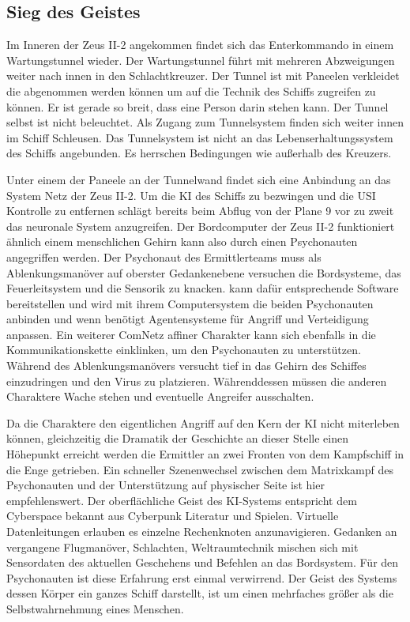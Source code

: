 \subsection{Sieg des Geistes}
Im Inneren der Zeus II-2 angekommen findet sich das Enterkommando in einem Wartungstunnel wieder. Der Wartungstunnel führt mit mehreren Abzweigungen weiter nach innen in den Schlachtkreuzer. Der Tunnel ist mit Paneelen verkleidet die abgenommen werden können um auf die Technik des Schiffs zugreifen zu können. Er ist gerade so breit, dass eine Person darin stehen kann. Der Tunnel selbst ist nicht beleuchtet. Als Zugang zum Tunnelsystem finden sich weiter innen im Schiff Schleusen. Das Tunnelsystem ist nicht an das Lebenserhaltungssystem des Schiffs angebunden. Es herrschen Bedingungen wie außerhalb des Kreuzers.

Unter einem der Paneele an der Tunnelwand findet sich eine Anbindung an das System Netz der Zeus II-2. Um die KI des Schiffs zu bezwingen und die USI Kontrolle zu entfernen schlägt \xl{} bereits beim Abflug von der Plane 9 vor zu zweit das neuronale System anzugreifen. Der Bordcomputer der Zeus II-2 funktioniert ähnlich einem menschlichen Gehirn kann also durch einen Psychonauten angegriffen werden. Der Psychonaut des Ermittlerteams muss als Ablenkungsmanöver auf oberster Gedankenebene versuchen die Bordsysteme, das Feuerleitsystem und die Sensorik zu knacken. \ml{} kann dafür entsprechende Software bereitstellen und wird mit ihrem Computersystem die beiden Psychonauten anbinden und wenn benötigt Agentensysteme für Angriff und Verteidigung anpassen. Ein weiterer ComNetz affiner Charakter kann sich ebenfalls in die Kommunikationskette einklinken, um den Psychonauten zu unterstützen. Während des Ablenkungsmanövers versucht \xl{} tief in das Gehirn des Schiffes einzudringen und den Virus zu platzieren. Währenddessen müssen die anderen Charaktere Wache stehen und eventuelle Angreifer ausschalten.

Da die Charaktere den eigentlichen Angriff auf den Kern der KI nicht miterleben können, gleichzeitig die Dramatik der Geschichte an dieser Stelle einen Höhepunkt erreicht werden die Ermittler an zwei Fronten von dem Kampfschiff in die Enge getrieben. Ein schneller Szenenwechsel zwischen dem Matrixkampf des Psychonauten und der Unterstützung auf physischer Seite ist hier empfehlenswert. Der oberflächliche Geist des KI-Systems entspricht dem Cyberspace bekannt aus Cyberpunk Literatur und Spielen. Virtuelle Datenleitungen erlauben es einzelne Rechenknoten anzunavigieren. Gedanken an vergangene Flugmanöver, Schlachten, Weltraumtechnik mischen sich mit Sensordaten des aktuellen Geschehens und Befehlen an das Bordsystem. Für den Psychonauten ist diese Erfahrung erst einmal verwirrend. Der Geist des Systems dessen Körper ein ganzes Schiff darstellt, ist um einen mehrfaches größer als die Selbstwahrnehmung eines Menschen.

